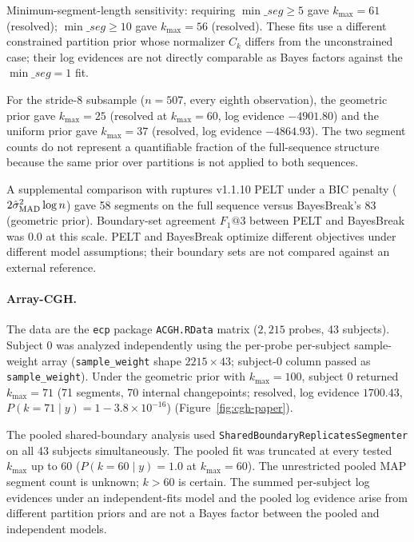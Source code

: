 Minimum-segment-length sensitivity: requiring $\min\_seg \geq 5$ gave $k_{\max}=61$ (resolved); $\min\_seg \geq 10$ gave $k_{\max}=56$ (resolved). These fits use a different constrained partition prior whose normalizer $C_k$ differs from the unconstrained case; their log evidences are not directly comparable as Bayes factors against the $\min\_seg=1$ fit.

For the stride-8 subsample ($n=507$, every eighth observation), the geometric prior gave $k_{\max}=25$ (resolved at $k_{\max}=60$, log evidence $-4901.80$) and the uniform prior gave $k_{\max}=37$ (resolved, log evidence $-4864.93$). The two segment counts do not represent a quantifiable fraction of the full-sequence structure because the same prior over partitions is not applied to both sequences.

A supplemental comparison with ruptures v1.1.10 PELT under a BIC penalty ($2 \hat{\sigma}^2_{\rm MAD} \log n$) gave 58 segments on the full sequence versus BayesBreak's 83 (geometric prior). Boundary-set agreement $F_1@3$ between PELT and BayesBreak was $0.0$ at this scale. PELT and BayesBreak optimize different objectives under different model assumptions; their boundary sets are not compared against an external reference.



\paragraph{Array-CGH.}
The data are the \texttt{ecp} package \texttt{ACGH.RData} matrix ($2{,}215$ probes, 43 subjects). Subject 0 was analyzed independently using the per-probe per-subject sample-weight array (\texttt{sample\_weight} shape $2215 \times 43$; subject-0 column passed as \texttt{sample\_weight}). Under the geometric prior with $k_{\max}=100$, subject 0 returned $k_{\max}=71$ (71 segments, 70 internal changepoints; resolved, log evidence $1700.43$, $P(k=71 \mid y) = 1 - 3.8 \times 10^{-16}$) (Figure~\ref{fig:cgh-paper}).

The pooled shared-boundary analysis used \texttt{SharedBoundaryReplicatesSegmenter} on all 43 subjects simultaneously. The pooled fit was truncated at every tested $k_{\max}$ up to 60 ($P(k=60 \mid y) = 1.0$ at $k_{\max}=60$). The unrestricted pooled MAP segment count is unknown; $k > 60$ is certain. The summed per-subject log evidences under an independent-fits model and the pooled log evidence arise from different partition priors and are not a Bayes factor between the pooled and independent models.

